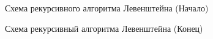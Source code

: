 \documentclass[a4paper,12pt]{article}
\begin{document}
\begin{figure}[p]
\caption{Схема рекурсивного алгоритма Левенштейна (Начало)}
\label{images:recursive_levenstein}
\end{figure}

\begin{figure}[p]
\caption{Схема рекурсивный алгоритма Левенштейна (Конец)}
\label{images:recursive_levenstein2}
\end{figure}
\end{document}
